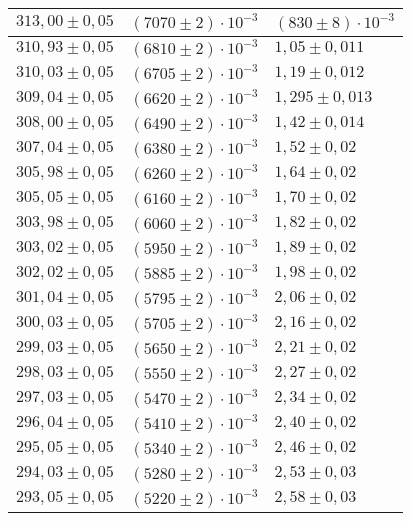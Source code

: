 \begin{tabular}{|l|l|l|}
$313{,}00 \pm 0{,}05$ & $\left(7070 \pm 2\right)\cdot 10^{-3}$ & $\left(830 \pm 8\right)\cdot 10^{-3}$\\\hline
$310{,}93 \pm 0{,}05$ & $\left(6810 \pm 2\right)\cdot 10^{-3}$ & $1{,}05 \pm 0{,}011$\\\hline
$310{,}03 \pm 0{,}05$ & $\left(6705 \pm 2\right)\cdot 10^{-3}$ & $1{,}19 \pm 0{,}012$\\\hline
$309{,}04 \pm 0{,}05$ & $\left(6620 \pm 2\right)\cdot 10^{-3}$ & $1{,}295 \pm 0{,}013$\\\hline
$308{,}00 \pm 0{,}05$ & $\left(6490 \pm 2\right)\cdot 10^{-3}$ & $1{,}42 \pm 0{,}014$\\\hline
$307{,}04 \pm 0{,}05$ & $\left(6380 \pm 2\right)\cdot 10^{-3}$ & $1{,}52 \pm 0{,}02$\\\hline
$305{,}98 \pm 0{,}05$ & $\left(6260 \pm 2\right)\cdot 10^{-3}$ & $1{,}64 \pm 0{,}02$\\\hline
$305{,}05 \pm 0{,}05$ & $\left(6160 \pm 2\right)\cdot 10^{-3}$ & $1{,}70 \pm 0{,}02$\\\hline
$303{,}98 \pm 0{,}05$ & $\left(6060 \pm 2\right)\cdot 10^{-3}$ & $1{,}82 \pm 0{,}02$\\\hline
$303{,}02 \pm 0{,}05$ & $\left(5950 \pm 2\right)\cdot 10^{-3}$ & $1{,}89 \pm 0{,}02$\\\hline
$302{,}02 \pm 0{,}05$ & $\left(5885 \pm 2\right)\cdot 10^{-3}$ & $1{,}98 \pm 0{,}02$\\\hline
$301{,}04 \pm 0{,}05$ & $\left(5795 \pm 2\right)\cdot 10^{-3}$ & $2{,}06 \pm 0{,}02$\\\hline
$300{,}03 \pm 0{,}05$ & $\left(5705 \pm 2\right)\cdot 10^{-3}$ & $2{,}16 \pm 0{,}02$\\\hline
$299{,}03 \pm 0{,}05$ & $\left(5650 \pm 2\right)\cdot 10^{-3}$ & $2{,}21 \pm 0{,}02$\\\hline
$298{,}03 \pm 0{,}05$ & $\left(5550 \pm 2\right)\cdot 10^{-3}$ & $2{,}27 \pm 0{,}02$\\\hline
$297{,}03 \pm 0{,}05$ & $\left(5470 \pm 2\right)\cdot 10^{-3}$ & $2{,}34 \pm 0{,}02$\\\hline
$296{,}04 \pm 0{,}05$ & $\left(5410 \pm 2\right)\cdot 10^{-3}$ & $2{,}40 \pm 0{,}02$\\\hline
$295{,}05 \pm 0{,}05$ & $\left(5340 \pm 2\right)\cdot 10^{-3}$ & $2{,}46 \pm 0{,}02$\\\hline
$294{,}03 \pm 0{,}05$ & $\left(5280 \pm 2\right)\cdot 10^{-3}$ & $2{,}53 \pm 0{,}03$\\\hline
$293{,}05 \pm 0{,}05$ & $\left(5220 \pm 2\right)\cdot 10^{-3}$ & $2{,}58 \pm 0{,}03$\\\hline
\end{tabular}

